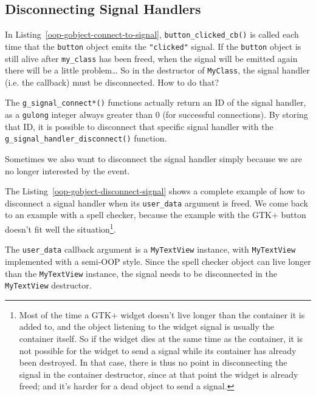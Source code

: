 \subsection{Disconnecting Signal Handlers}

In Listing~\ref{oop-gobject-connect-to-signal}, \lstinline{button_clicked_cb()} is called each time that the \lstinline{button} object emits the \lstinline{"clicked"} signal. If the \lstinline{button} object is still alive after \lstinline{my_class} has been freed, when the signal will be emitted again there will be a little problem… So in the destructor of \lstinline{MyClass}, the signal handler (i.e. the callback) must be disconnected. How to do that?

The \lstinline{g_signal_connect*()} functions actually return an ID of the signal handler, as a \lstinline{gulong} integer always greater than 0 (for successful connections). By storing that ID, it is possible to disconnect that specific signal handler with the \lstinline{g_signal_handler_disconnect()} function.

Sometimes we also want to disconnect the signal handler simply because we are no longer interested by the event.

The Listing~\ref{oop-gobject-disconnect-signal} shows a complete example of how to disconnect a signal handler when its \lstinline{user_data} argument is freed. We come back to an example with a spell checker, because the example with the GTK+ button doesn't fit well the situation\footnote{Most of the time a GTK+ widget doesn't live longer than the container it is added to, and the object listening to the widget signal is usually the container itself. So if the widget dies at the same time as the container, it is not possible for the widget to send a signal while its container has already been destroyed. In that case, there is thus no point in disconnecting the signal in the container destructor, since at that point the widget is already freed; and it's harder for a dead object to send a signal\footnotemark.}.

The \lstinline{user_data} callback argument is a \lstinline{MyTextView} instance, with \lstinline{MyTextView} implemented with a semi-OOP style. Since the spell checker object can live longer than the \lstinline{MyTextView} instance, the signal needs to be disconnected in the \lstinline{MyTextView} destructor.

